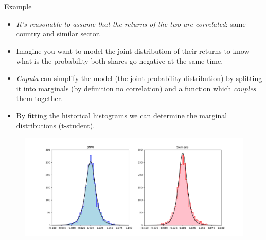 \documentclass{beamer}
\begin{document}
\begin{frame}{Example}
  \begin{itemize}
    \item \emph{It's reasonable to assume that the returns of the two are correlated}: same country and similar sector.
    \item Imagine you want to model the joint distribution of their returns to know what is the probability both shares go negative at the same time.
    \item \emph{Copula} can simplify the model (the joint probability distribution) by splitting it into marginals (by definition no correlation) and a function which \emph{couples} them together.
    \item By fitting the historical histograms we can determine the marginal distributions (t-student).
  \end{itemize}
 \begin{figure}[h]
   \begin{center}
     \includegraphics[width=0.65\linewidth]{bmw_siemens_dist}
   \end{center}
 \end{figure}
\end{frame}
\end{document}
